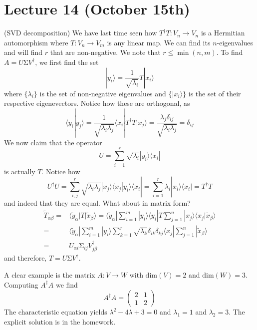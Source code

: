 \section{Lecture 14 (October 15th)}
\begin{defi}
(SVD decomposition) We have last time seen how $T^{\dagger }T:V_{n}\rightarrow V_{n}$ is a Hermitian automorphism where $T:V_{n}\rightarrow V_{m}$ is any linear map. We can find its $n$-eigenvalues and will find $r$ that are non-negative. We note that $r\leq \min (n,m)$. To find $A=U\mathrm{\Sigma} V^{\dagger }$, we first find the set
\[|y_{i}\rangle =\dfrac{1}{\sqrt{\lambda _{i}}}T|x_{i}\rangle \]
where $\{\lambda _{i}\}$ is the set of non-negative eigenvalues and $\{|x_{i}\rangle \}$ is the set of their respective eigenevectors. Notice how these are orthogonal, as
\[\langle y_{i}|y_{j}\rangle =\dfrac{1}{\sqrt{\lambda _{i}\lambda _{j}}}\langle x_{i}|T^{\dagger }T|x_{j}\rangle=\dfrac{\lambda _{j}\delta _{ij}}{\sqrt{\lambda _{i}\lambda _{j}}} =\delta _{ij}\]
We now claim that the operator
\[U=\sum ^{r}_{i=1}\sqrt{\lambda _{i}}|y_{i}\rangle \langle x_{i}|\]
is actually $T$. Notice how
\[U^{\dagger }U=\sum ^{r}_{i,j}\sqrt{\lambda _{i}\lambda _{j}}|x_{j}\rangle \langle x_{j}|y_{i}\rangle \langle x_{i}|=\sum ^{r}_{i=1}\lambda _{i}|x_{i}\rangle \langle x_{i}|=T^{\dagger }T\]
and indeed that they are equal. What about in matrix form? 
\[\begin{align*}
\tilde{T}_{\alpha \beta }=&\langle \tilde{y}_{\alpha }|T|\tilde{x}_{\beta }\rangle =\langle \tilde{y}_{\alpha }|\sum ^{m}_{i=1}|y_{i}\rangle \langle y_{i}|T\sum ^{n}_{j=1}|x_{j}\rangle \langle x_{j}|\tilde{x}_{\beta }\rangle \\
=&\langle \tilde{y}_{\alpha }|\sum ^{m}_{i=1}|y_{i}\rangle \sum ^{r}_{k=1}\sqrt{\lambda _{k}}\delta _{ik}\delta _{kj}\langle x_{j}|\sum _{j=1}^{n}|\tilde{x}_{\beta }\rangle \\
=&U_{\alpha i}\mathrm{\Sigma} _{ij}V_{j \beta }^{\dagger }
\end{align*}\]
and therefore, $T=U\mathrm{\Sigma} V^{\dagger }$.
\end{defi}
\vspace{2ex}
\begin{ex}
A clear example is the matrix $A:V\rightarrow W$ with $\mathrm{dim}(V)=2$ and $\mathrm{dim}(W)=3$. Computing $A^{\dagger }A$ we find
\[A^{\dagger }A=\begin{pmatrix}
2&1\\1&2
\end{pmatrix}
\]
The characteristic equation yields $\lambda ^2-4\lambda +3=0$ and $\lambda_1=1$ and $\lambda_{2}=3$. The explicit solution is in the homework.
\end{ex}
